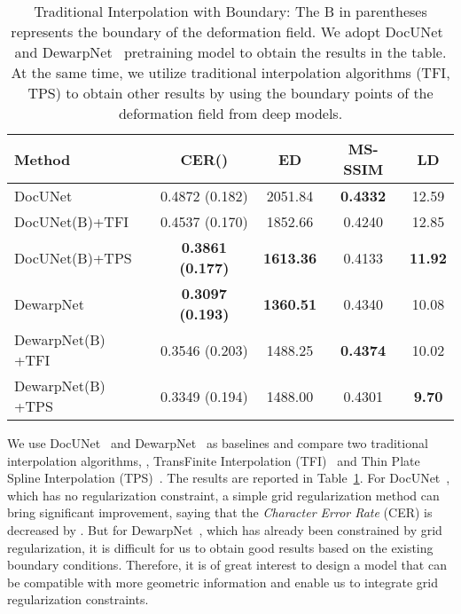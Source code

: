 \documentclass[10pt,twocolumn,letterpaper]{article}
\begin{document}
\begin{table}[!t]
\scriptsize
  \centering
    \caption{Traditional Interpolation with Boundary: The B in parentheses represents the boundary of the deformation field. We adopt DocUNet~\cite{Ma_2018_CVPR} and DewarpNet~\cite{Das_2019_ICCV} pretraining model to obtain the results in the table. At the same time, we utilize traditional interpolation algorithms (TFI, TPS) to obtain other results by using the boundary points of the deformation field from deep models.}
    \vspace{-3mm}
  \begin{tabular}{lcccc}
    \toprule
    \textbf{Method} &  \textbf{CER}()  & \textbf{ED}  &\textbf{MS-SSIM}  & \textbf{LD} \\
    \midrule
    DocUNet~\cite{Ma_2018_CVPR} & 0.4872 (0.182) & 2051.84 & \textbf{0.4332} & 12.59	\\
    DocUNet(B)+TFI & 0.4537 (0.170) & 	1852.66 & 0.4240	& 12.85\\
    DocUNet(B)+TPS & \textbf{0.3861 (0.177)} & \textbf{1613.36} & 0.4133 & \textbf{11.92}  \\
    	
    \midrule
    DewarpNet~\cite{Das_2019_ICCV} & \textbf{0.3097 (0.193)} & \textbf{1360.51} & 0.4340	& 10.08	\\
    DewarpNet(B) +TFI & 0.3546 (0.203)	& 1488.25 & \textbf{0.4374} & 10.02	\\
    DewarpNet(B) +TPS &  0.3349 (0.194)	& 1488.00 & 0.4301 & \textbf{9.70} \\
    \bottomrule
  \end{tabular}
  \label{tab:bound}
  \vspace{2em}
\end{table}


We use DocUNet~\cite{Ma_2018_CVPR} and DewarpNet~\cite{Das_2019_ICCV} as baselines and compare two traditional interpolation algorithms, \ie, TransFinite Interpolation (TFI)~\cite{gordon1973transfinite} and Thin Plate Spline Interpolation (TPS)~\cite{bookstein1989principal}. The results are reported in Table~\ref{tab:bound}. 
For DocUNet~\cite{Ma_2018_CVPR}, which has no regularization constraint, a simple grid regularization method can bring significant improvement, saying that the {\em Character Error Rate} (CER) is decreased by . But for DewarpNet~\cite{Das_2019_ICCV}, which has already been constrained by grid regularization, it is difficult for us to obtain good results based on the existing boundary conditions. Therefore,
it is of great interest to design a model that can be compatible with more geometric information and enable us to integrate grid regularization constraints.
\end{document}
